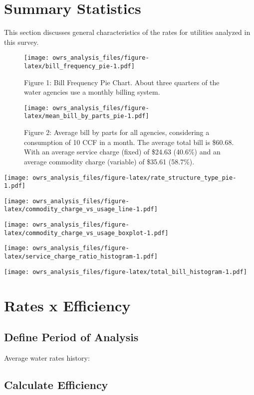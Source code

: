 \documentclass[]{article}
\begin{document}
\section{Summary Statistics}\label{summary-statistics}

This section discusses general characteristics of the rates for
utilities analyzed in this survey.

\begin{figure}
\centering
\texttt{[image: owrs\_analysis\_files/figure-latex/bill\_frequency\_pie-1.pdf]}
\caption{Figure 1: Bill Frequency Pie Chart. About three quarters of the
water agencies use a monthly billing system.}
\end{figure}

\begin{figure}
\centering
\texttt{[image: owrs\_analysis\_files/figure-latex/mean\_bill\_by\_parts\_pie-1.pdf]}
\caption{Figure 2: Average bill by parts for all agencies, considering a
consumption of 10 CCF in a month. The average total bill is \$60.68.
With an average service charge (fixed) of \$24.63 (40.6\%) and an
average commodity charge (variable) of \$35.61 (58.7\%).}
\end{figure}

\texttt{[image: owrs\_analysis\_files/figure-latex/rate\_structure\_type\_pie-1.pdf]}

\texttt{[image: owrs\_analysis\_files/figure-latex/commodity\_charge\_vs\_usage\_line-1.pdf]}

\texttt{[image: owrs\_analysis\_files/figure-latex/commodity\_charge\_vs\_usage\_boxplot-1.pdf]}

\texttt{[image: owrs\_analysis\_files/figure-latex/service\_charge\_ratio\_histogram-1.pdf]}

\texttt{[image: owrs\_analysis\_files/figure-latex/total\_bill\_histogram-1.pdf]}

\section{Rates x Efficiency}\label{rates-x-efficiency}

\subsection{Define Period of Analysis}\label{define-period-of-analysis}

Average water rates history:

\subsection{Calculate Efficiency}\label{calculate-efficiency}
\end{document}
